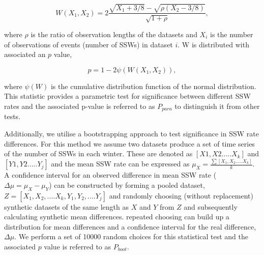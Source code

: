 \begin{equation} \label{deltalambda}
W(X_1, X_2) = 2 \frac{\sqrt{X_1 + 3/8} - \sqrt{\rho(X_2 - 3/8)}}
{\sqrt{1 + \rho}},
\end{equation}

where $\rho$ is the ratio of observation lengths of the datasets and $X_i$ is the number of observations of events (number of SSWs) in dataset $i$. W is distributed with associated an $p$ value, 

\begin{equation} \label{Pval}
p = 1-2\psi(W(X_1, X_2)),
\end{equation}

where $\psi(W)$ is the cumulative distribution function of the normal distribution. This statistic provides a parametric test for significance between different SSW rates and the associated p-value is referred to as $P_{para}$ to distinguish it from other tests. 

Additionally, we utilise a bootstrapping approach to test significance in SSW rate differences. For this method we assume two datasets produce a set of time series of the number of SSWs in each winter. These are denoted as $[X1,X2.....X_k]$ and $[Y1,Y2.....Y_j]$ and the mean SSW rate can be expressed as $\mu_X = \frac{\sum[X_1,X_2.....X_k]}{k}$. A confidence interval for an observed difference in mean SSW rate ($\Delta\mu = \mu_X - \mu_Y$) can be constructed by forming a pooled dataset, $Z = [X_1, X_2,....X_k,Y_1,Y_2,....Y_j]$ and randomly choosing (without replacement) synthetic datasets of the same length as $X$ and $Y$ from $Z$ and subsequently calculating synthetic mean differences. repeated choosing can build up a distribution for mean differences and a confidence interval for the real difference, $\Delta\mu$. We perform a set of 10000 random choices for this statistical test and the associated $p$ value is referred to as $P_{boot}$.


